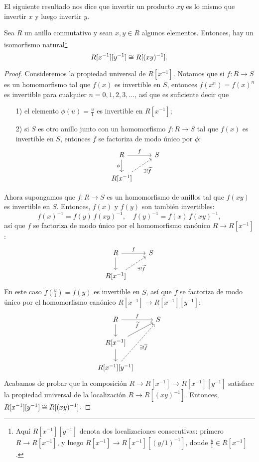 El siguiente resultado nos dice que invertir un producto $xy$ es lo mismo que
invertir $x$ y luego invertir $y$.

\begin{proposicion}
  Sea $R$ un anillo conmutativo y sean $x,y\in R$ algunos elementos. Entonces,
  hay un isomorfismo natural\footnote{Aquí $R [x^{-1}] [y^{-1}]$ denota dos
    localizaciones consecutivas: primero $R \to R [x^{-1}]$, y luego
    $R [x^{-1}] \to R [x^{-1}] [(y/1)^{-1}]$, donde
    $\frac{y}{1} \in R [x^{-1}]$.}
  $$R [x^{-1}] [y^{-1}] \cong R [(xy)^{-1}].$$

  \begin{proof}
    Consideremos la propiedad universal de $R [x^{-1}]$. Notamos que si
    $f\colon R\to S$ es un homomorfismo tal que $f (x)$ es invertible en $S$,
    entonces $f (x^n) = f (x)^n$ es invertible para cualquier
    $n = 0,1,2,3,\ldots$, así que es suficiente decir que

    \begin{enumerate}
    \item[1)] el elemento $\phi (u) = \frac{u}{1}$ es invertible en
      $R [x^{-1}]$;

    \item[2)] si $S$ es otro anillo junto con un homomorfismo $f\colon R \to S$
      tal que $f (x)$ es invertible en $S$, entonces $f$ se factoriza de modo
      único por $\phi$:
      \[ \begin{tikzcd}
          R\ar{r}{f}\ar{d}[swap]{\phi} & S \\
          R [x^{-1}]\ar[dashed]{ur}[swap]{\exists ! \widetilde{f}}
        \end{tikzcd} \]
    \end{enumerate}

    Ahora supongamos que $f\colon R\to S$ es un homomorfismo de anillos tal que
    $f (xy)$ es invertible en $S$. Entonces, $f (x)$ y $f (y)$ son también
    invertibles:
    $$f (x)^{-1} = f (y)\,f (xy)^{-1}, \quad f (y)^{-1} = f (x)\,f (xy)^{-1},$$
    así que $f$ se factoriza de modo único por el homomorfismo canónico
    $R \to R [x^{-1}]$:
    \[ \begin{tikzcd}
        R\ar{r}{f}\ar{d} & S \\
        R [x^{-1}]\ar[dashed]{ur}[swap]{\exists ! \widetilde{f}}
      \end{tikzcd} \]
    En este caso $\widetilde{f} \left(\frac{y}{1}\right) = f (y)$ es invertible
    en $S$, así que $\widetilde{f}$ se factoriza de modo único por
    el homomorfismo canónico $R [x^{-1}] \to R [x^{-1}] [y^{-1}]$:
    \[ \begin{tikzcd}
        R\ar{r}{f}\ar{d} & S \\
        R [x^{-1}]\ar{d}\ar{ur}{\widetilde{f}} \\
        R [x^{-1}] [y^{-1}]\ar[dashed]{uur}[swap]{\exists ! \overline{f}}
      \end{tikzcd} \]
    Acabamos de probar que la composición
    $R \to R [x^{-1}] \to R [x^{-1}] [y^{-1}]$ satisface la propiedad universal
    de la localización $R \to R [(xy)^{-1}]$. Entonces,
    $R [x^{-1}] [y^{-1}] \cong R [(xy)^{-1}]$.
  \end{proof}
\end{proposicion}


